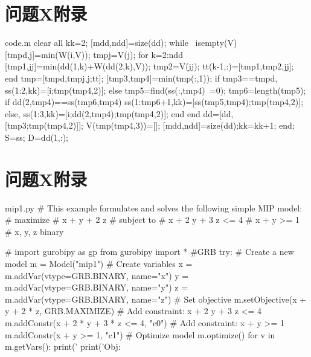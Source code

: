 \documentclass[bwprint]{gmcmthesis}
\begin{document}
\clearpage
\begin{appendices}

\clearpage
\section{问题X附录} %
\vspace{-2ex}
\begin{Matlab}{code.m}
clear all
kk=2;
[mdd,ndd]=size(dd);
while ~isempty(V)
    [tmpd,j]=min(W(i,V));
    tmpj=V(j);
    for k=2:ndd
        [tmp1,jj]=min(dd(1,k)+W(dd(2,k),V));
        tmp2=V(jj);
        tt(k-1,:)=[tmp1,tmp2,jj];
    end
    tmp=[tmpd,tmpj,j;tt];
    [tmp3,tmp4]=min(tmp(:,1));
    if tmp3==tmpd,
        ss(1:2,kk)=[i;tmp(tmp4,2)];
    else
        tmp5=find(ss(:,tmp4)~=0);
        tmp6=length(tmp5);
        if dd(2,tmp4)==ss(tmp6,tmp4)
            ss(1:tmp6+1,kk)=[ss(tmp5,tmp4);tmp(tmp4,2)];
        else, ss(1:3,kk)=[i;dd(2,tmp4);tmp(tmp4,2)];
        end
    end
    dd=[dd,[tmp3;tmp(tmp4,2)]];
    V(tmp(tmp4,3))=[];
    [mdd,ndd]=size(dd);kk=kk+1;
end;
S=ss; D=dd(1,:);
\end{Matlab}
\vspace{2ex}

\clearpage
\section{问题X附录} %
\vspace{-2ex}
\begin{Python}{mip1.py}
# This example formulates and solves the following simple MIP model:
#  maximize
#        x +   y + 2 z
#  subject to
#        x + 2 y + 3 z <= 4
#        x +   y       >= 1
#        x, y, z binary

# import gurobipy as gp
from gurobipy import * #GRB
try:
    # Create a new model
    m = Model("mip1")
    # Create variables
    x = m.addVar(vtype=GRB.BINARY, name="x")
    y = m.addVar(vtype=GRB.BINARY, name="y")
    z = m.addVar(vtype=GRB.BINARY, name="z")
    # Set objective
    m.setObjective(x + y + 2 * z, GRB.MAXIMIZE)
    # Add constraint: x + 2 y + 3 z <= 4
    m.addConstr(x + 2 * y + 3 * z <= 4, "c0")
    # Add constraint: x + y >= 1
    m.addConstr(x + y >= 1, "c1")
    # Optimize model
    m.optimize()
    for v in m.getVars():
        print('%
    print('Obj: %


\end{Python}
\end{appendices}
\end{document}
